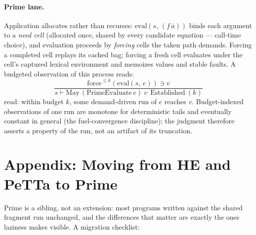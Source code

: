 \documentclass[11pt]{article}
\newcommand{\eval}[2]{\mathrm{eval}(#1,\,#2)}
\newcommand{\PeTTa}{\textup{PeTTa}}
\newcommand{\HE}{\textup{HE}}
\begin{document}
\paragraph{Prime lane.}  Application allocates rather than recurses:
$\eval{s}{(f\,\bar a)}$ binds each argument to a \emph{need cell}
(allocated once, shared by every candidate equation --- call-time
choice), and evaluation proceeds by \emph{forcing} cells the taken path
demands.  Forcing a completed cell replays its cached bag; forcing a
fresh cell evaluates under the cell's captured lexical environment and
memoizes values and stable faults.  A budgeted observation of this
process reads:
\[
\frac{\mathrm{force}^{\le k}(\eval{s}{e}) \ni v}
     {s \vdash \mathrm{May}\,(\mathrm{PrimeEvaluate}\ e)\ v\ \ \text{Established}\ (k)}
\]
read: within budget $k$, some demand-driven run of $e$ reaches $v$.
Budget-indexed observations of one run are monotone for deterministic
tails and eventually constant in general (the fuel-convergence
discipline); the judgment therefore asserts a property of the run, not
an artifact of its truncation.


\section{Appendix: Moving from \HE{} and \PeTTa{} to Prime}
\label{app:migration}

Prime is a sibling, not an extension: most programs written against the
shared fragment run unchanged, and the differences that matter are
exactly the ones laziness makes visible.  A migration checklist:
\end{document}

